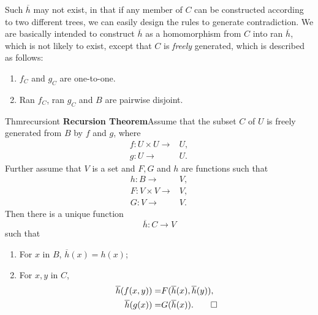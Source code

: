 Such $\overline{h}$ may not exist, in that if any member of $C$ can be constructed according to two different trees, we can easily design the rules to generate contradiction. We are basically intended to construct $\overline{h}$ as a homomorphism from $C$ into ran $\overline{h}$, which is not likely to exist, except that $C$ is \textit{freely} generated, which is described as follows:
\begin{enumerate}
  \item $f_C$ and $g_C$ are one-to-one.
  \item Ran $f_C$, ran $g_C$ and $B$ are pairwise disjoint.
\end{enumerate}

\begin{reference}{Thm}{recursiont}
  \textbf{Recursion Theorem}\quad Assume that the subset $C$ of $U$ is freely generated from $B$ by $f$ and $g$, where
  \begin{align*}
    f:U\times U\rightarrow & U, \\
    g:U\rightarrow         & U.
  \end{align*}
  Further assume that $V$ is a set and $F,G$ and $h$ are functions such that
  \begin{align*}
    h:B\rightarrow         & V, \\
    F:V\times V\rightarrow & V, \\
    G:V\rightarrow         & V.
  \end{align*}
  Then there is a unique function
  \[
    \overline{h}:C\rightarrow V
  \]
  such that
  \begin{enumerate}
    \item For $x$ in $B$, $\overline{h}(x)=h(x)$;
    \item For $x,y$ in $C$,
          \begin{align*}
            \overline{h}(f(x,y))= & F(\overline{h}(x),\overline{h}(y)), \\
            \overline{h}(g(x))=   & G(\overline{h}(x)).\qedhere
          \end{align*}
  \end{enumerate}
\end{reference}

